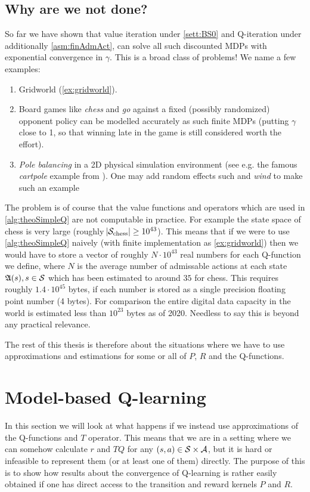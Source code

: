 \subsection{Why are we not done?}

So far we have shown that value iteration under \cref{sett:BS0}
and Q-iteration under additionally \cref{asm:finAdmAct}, can solve
all such discounted MDPs with exponential convergence in $\gamma$.
This is a broad class of problems!
We name a few examples:
\begin{enumerate}
  \item Gridworld (\cref{ex:gridworld}).
  \item Board games like \emph{chess} and \emph{go}
    against a fixed (possibly randomized) opponent policy
    can be modelled accurately
    as such finite MDPs (putting $\gamma$ close to 1, so that winning late in 
    the game is still considered worth the effort).
  \item \emph{Pole balancing} in a 2D physical simulation environment
    (see e.g. the famous \emph{cartpole} example from ).
    One may add random effects such and \emph{wind} to make such an example
\end{enumerate}
The problem is of course that the value functions and operators
which are used in \cref{alg:theoSimpleQ} are not computable in practice.
For example the state space of chess is very large
(roughly $\abs{\mathcal{S}_{\mathrm{chess}}} \geq 10^{43}$).
This means that if we were to use \cref{alg:theoSimpleQ} naively
(with finite implementation as \cref{ex:gridworld})
then we would have to store a vector of
roughly $N \cdot 10^{43}$ real numbers for each Q-function we define,
where $N$ is the average number of admissable actions at each state
$\frak{A}(s), s \in \mathcal{S}$
which has been estimated to around $35$ for chess.
This requires roughly $1.4 \cdot 10^{45}$ bytes, if each number is stored as a
single precision floating point number (4 bytes).
For comparison the entire digital data capacity in the world is estimated
less than $10^{23}$ bytes as of 2020.
Needless to say this is beyond any practical relevance.

The rest of this thesis is therefore about the situations where we have
to use approximations and estimations for some or all of $P$, $R$ and
the Q-functions.

\section{Model-based Q-learning}
In this section we will look at what happens if we
instead use approximations of the Q-functions and $T$ operator.
This means that we are in a setting where we can somehow
calculate $r$ and $TQ$ for any $(s,a) \in \mathcal{S} \times \mathcal{A}$,
but it is hard or infeasible to represent them (or at least one of them)
directly.
The purpose of this is to show how results about the convergence of Q-learning
is rather easily obtained if one has direct access
to the transition and reward kernels $P$ and $R$.


